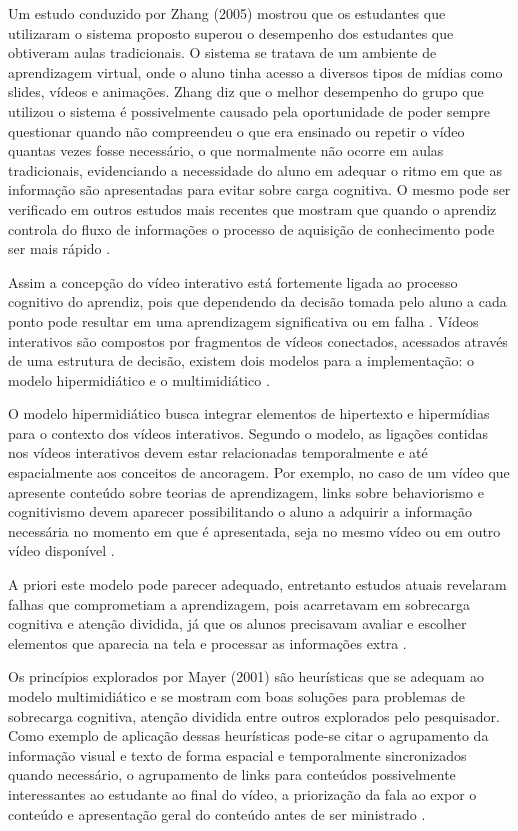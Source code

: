 Um estudo conduzido por Zhang (2005) mostrou que os estudantes que utilizaram o sistema proposto superou o desempenho dos estudantes que obtiveram aulas tradicionais. O sistema se tratava de um ambiente de aprendizagem virtual, onde o aluno tinha acesso a diversos tipos de mídias como slides, vídeos e animações. Zhang diz que o melhor desempenho do grupo que utilizou o sistema é possivelmente causado pela oportunidade de poder sempre questionar quando não compreendeu o que era ensinado ou repetir o vídeo quantas vezes fosse necessário, o que normalmente não ocorre em aulas tradicionais, evidenciando a necessidade do aluno em adequar o ritmo em que as informação são apresentadas para evitar sobre carga cognitiva. O mesmo pode ser verificado em outros estudos mais recentes que mostram que quando o aprendiz controla do fluxo de informações o processo de aquisição de conhecimento pode ser mais rápido \cite{schwan2004, mayer2001, zhang2005}.

Assim a concepção do vídeo interativo está fortemente ligada ao processo cognitivo do aprendiz, pois que dependendo da decisão tomada pelo aluno a cada ponto pode resultar em uma aprendizagem significativa ou em falha \cite{moreno2000}. Vídeos interativos são compostos por fragmentos de vídeos conectados, acessados através de uma estrutura de decisão, existem dois modelos para a implementação: o modelo hipermidiático e o multimidiático \cite{wetzel1994}.

O modelo hipermidiático busca integrar elementos de hipertexto e hipermídias para o contexto dos vídeos interativos. Segundo o modelo, as ligações contidas nos vídeos interativos devem estar relacionadas temporalmente e até espacialmente aos conceitos de ancoragem. Por exemplo, no caso de um vídeo que apresente conteúdo sobre teorias de aprendizagem, links sobre behaviorismo e cognitivismo devem aparecer possibilitando o aluno a adquirir a informação necessária no momento em que é apresentada, seja no mesmo vídeo ou em outro vídeo disponível \cite{wetzel1994}.

A priori este modelo pode parecer adequado, entretanto estudos atuais revelaram falhas que comprometiam a aprendizagem, pois acarretavam em sobrecarga cognitiva e atenção dividida, já que os alunos precisavam avaliar e escolher elementos que aparecia na tela e processar as informações extra \cite{zhang2005, moreno2000}.

Os princípios explorados por Mayer (2001) são heurísticas que se adequam ao modelo multimidiático e se mostram com boas soluções para problemas de sobrecarga cognitiva, atenção dividida entre outros explorados pelo pesquisador. Como exemplo de aplicação dessas heurísticas pode-se citar o agrupamento da informação visual e texto de forma espacial e temporalmente sincronizados quando necessário, o agrupamento de links para conteúdos possivelmente interessantes ao estudante ao final do vídeo, a priorização da fala ao expor o conteúdo e apresentação geral do conteúdo antes de ser ministrado \cite{mayer2001}.

